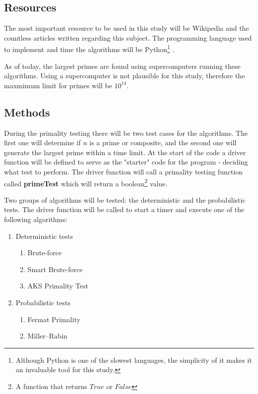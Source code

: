 \documentclass[main.tex]{subfiles}
\begin{document}
\subsection{Resources}

The most important resource to be used in this study will be Wikipedia and the countless articles written regarding this subject. The programming language used to implement and time the algorithms will be Python\footnote{Although Python is one of the slowest languages, the simplicity of it makes it an invaluable tool for this study.} \cite{python}.

As of today, the largest primes are found using supercomputers running these algorithms. Using a supercomputer is not plausible for this study, therefore the maxmimum limit for primes will be $10^{14}$.

\subsection{Methods}
During the primality testing \cite{prime:test} there will be two test cases for the algorithms. The first one will determine if $n$ is a prime or composite, and the second one will generate the largest prime within a time limit. At the start of the code a driver function will be defined to serve as the "starter" code for the program - deciding what test to perform. The driver function will call a primality testing function called \textbf{primeTest} which will return a boolean\footnote{A function that returns $True$ or $False$} value. 

Two groups of algorithms will be tested: the deterministic and the probabilistic tests. The driver function will be called to start a timer and execute one of the following algorithms:
\begin{enumerate}
    \item Deterministic tests \cite{algh:determ}
    \begin{enumerate}
        \item Brute-force
        \item Smart Brute-force
        \item AKS Primality Test \cite{algh:AKS}
    \end{enumerate}
    \item Probabilistic tests \cite{algh:probab}
    \begin{enumerate}
        \item Fermat Primality \cite{algh:fermat}
        \item Miller–Rabin \cite{algh:miller}
    \end{enumerate}
\end{enumerate}
\end{document}
